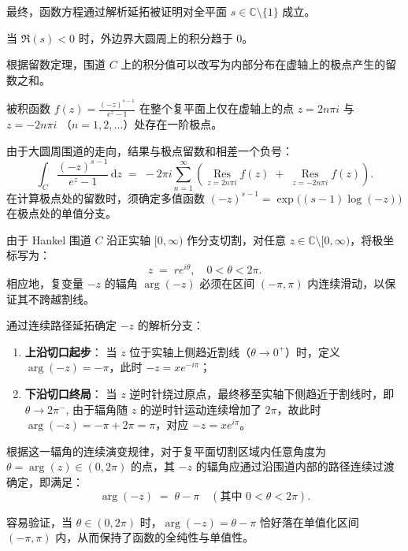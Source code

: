 最终，函数方程通过解析延拓被证明对全平面 $s \in \mathbb{C} \setminus \{1\}$ 成立。

当 $\Re(s)<0$ 时，外边界大圆周上的积分趋于 $0$。

根据留数定理，围道 $C$ 上的积分值可以改写为内部分布在虚轴上的极点产生的留数之和。

被积函数 $f(z) = \frac{(-z)^{s-1}}{e^z - 1}$ 在整个复平面上仅在虚轴上的点 $z = 2n\pi i$ 与 $z = -2n\pi i$ （$n=1,2,\dots$）处存在一阶极点。

由于大圆周围道的走向，结果与极点留数和相差一个负号：
\[
   \int_{C} \frac{(-z)^{s-1}}{e^z - 1} \,\mathrm{d}z \;=\; -2\pi i \sum_{n=1}^{\infty} \left( \mathop{\mathrm{Res}}\limits_{z=2n\pi i} f(z) \;+\; \mathop{\mathrm{Res}}\limits_{z=-2n\pi i} f(z) \right).
\]
在计算极点处的留数时，须确定多值函数 $(-z)^{s-1} = \exp\big((s-1)\log(-z)\big)$ 在极点处的单值分支。

由于 Hankel 围道 $C$ 沿正实轴 $[0,\infty)$ 作分支切割，对任意 $z\in\mathbb{C}\setminus[0,\infty)$，将极坐标写为：
\[
  z \;=\; r e^{i\theta}, \quad 0 < \theta < 2\pi.
\]
相应地，复变量 $-z$ 的辐角 $\arg(-z)$ 必须在区间 $(-\pi, \pi)$ 内连续滑动，以保证其不跨越割线。

通过连续路径延拓确定 $-z$ 的解析分支：
\begin{enumerate}
  \item \textbf{上沿切口起步}：
  当 $z$ 位于实轴上侧趋近割线（$\theta\to 0^+$）时，定义 $\arg(-z) = -\pi$，此时 $-z = x e^{-i\pi}$；

  \item \textbf{下沿切口终局}：
  当 $z$ 逆时针绕过原点，最终移至实轴下侧趋近于割线时，即 $\theta \to 2\pi^-$,
  由于辐角随 $z$ 的逆时针运动连续增加了 $2\pi$，故此时 $\arg(-z) = -\pi + 2\pi = \pi$，对应 $-z = x e^{i\pi}$。
\end{enumerate}

根据这一辐角的连续演变规律，对于复平面切割区域内任意角度为 $\theta = \arg(z) \in (0, 2\pi)$ 的点，其 $-z$ 的辐角应通过沿围道内部的路径连续过渡确定，即满足：
\begin{equation}
\label{eq:argument_continuation}
  \arg(-z) \;=\; \theta - \pi \quad (\text{其中 } 0 < \theta < 2\pi).
\end{equation}

容易验证，当 $\theta \in (0, 2\pi)$ 时，$\arg(-z) = \theta - \pi$ 恰好落在单值化区间 $(-\pi, \pi)$ 内，从而保持了函数的全纯性与单值性。

